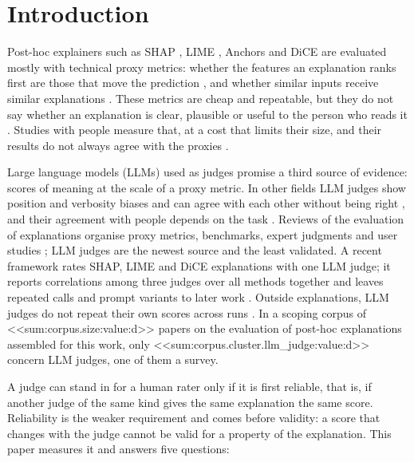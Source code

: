 \documentclass[12pt,letterpaper]{article}
\begin{document}
\section{Introduction}

Post-hoc explainers such as SHAP \cite{lundberg2017unified}, LIME \cite{ribeiro2016why},
Anchors \cite{ribeiro2018anchors} and DiCE \cite{mothilal2020dice} are evaluated mostly
with technical proxy metrics: whether the features an explanation ranks first are those
that move the prediction \cite{bhatt2020evaluating}, and whether similar inputs receive
similar explanations \cite{alvarezmelis2018robustness}. These metrics are cheap and
repeatable, but they do not say whether an explanation is clear, plausible or useful to
the person who reads it \cite{doshivelez2017rigorous,jacovi2020faithfulness}. Studies with
people measure that, at a cost that limits their size, and their results do not always
agree with the proxies \cite{bucinca2020proxy,bansal2021whole}.

Large language models (LLMs) used as judges promise a third source of evidence: scores of
meaning at the scale of a proxy metric. In other fields LLM judges show position and
verbosity biases and can agree with each other without being right
\cite{zheng2023judging,gu2024llmjudge}, and their agreement with people depends on the
task \cite{wu2025userperceptions,zhou2025medthink}. Reviews of the evaluation of
explanations organise proxy metrics, benchmarks, expert judgments and user studies
\cite{nauta2023anecdotal,mohseni2021survey,longo2024manifesto}; LLM judges are the newest
source and the least validated. A recent framework rates SHAP, LIME and DiCE explanations
with one LLM judge; it reports correlations among three judges over all methods together
and leaves repeated calls and prompt variants to later work
\cite{hufleischhauer2026xaiarena}. Outside explanations, LLM judges do not repeat their
own scores across runs \cite{haldar2025rating}. In a scoping corpus of <<sum:corpus.size:value:d>> papers
on the evaluation of post-hoc explanations assembled for this work, only
<<sum:corpus.cluster.llm_judge:value:d>> concern LLM judges, one of them a survey.

A judge can stand in for a human rater only if it is first reliable, that is, if another
judge of the same kind gives the same explanation the same score. Reliability is the
weaker requirement and comes before validity: a score that changes with the judge cannot
be valid for a property of the explanation. This paper measures it and answers five
questions:
\end{document}
